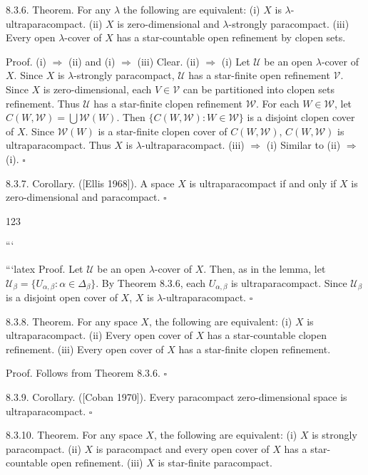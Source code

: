 \documentclass[jiang8iv.tex]{subfiles}
\begin{document}
8.3.6. Theorem. For any \(\lambda\) the following are equivalent:
(i) \(X\) is \(\lambda\)-ultraparacompact.
(ii) \(X\) is zero-dimensional and \(\lambda\)-strongly paracompact.
(iii) Every open \(\lambda\)-cover of \(X\) has a star-countable open refinement by clopen sets.

Proof. (i) \(\Rightarrow\) (ii) and (i) \(\Rightarrow\) (iii) Clear.
(ii) \(\Rightarrow\) (i) Let \(\mathscr{U}\) be an open \(\lambda\)-cover of \(X\). Since \(X\) is \(\lambda\)-strongly paracompact, \(\mathscr{U}\) has a star-finite open refinement \(\mathscr{V}\). Since \(X\) is zero-dimensional, each \(V\in\mathscr{V}\) can be partitioned into clopen sets refinement. Thus \(\mathscr{U}\) has a star-finite clopen refinement \(\mathscr{W}\). For each \(W\in\mathscr{W}\), let \(C(W,\mathscr{W})=\bigcup\mathscr{W}(W)\). Then \(\{C(W,\mathscr{W}): W\in\mathscr{W}\}\) is a disjoint clopen cover of \(X\). Since \(\mathscr{W}(W)\) is a star-finite clopen cover of \(C(W,\mathscr{W})\), \(C(W,\mathscr{W})\) is ultraparacompact. Thus \(X\) is \(\lambda\)-ultraparacompact.
(iii) \(\Rightarrow\) (i) Similar to (ii) \(\Rightarrow\) (i). \(\square\)

8.3.7. Corollary. ([Ellis 1968]). A space \(X\) is ultraparacompact if and only if \(X\) is zero-dimensional and paracompact. \(\square\)

123

```

```latex
Proof. Let \(\mathscr{U}\) be an open \(\lambda\)-cover of \(X\). Then, as in the lemma, let \(\mathscr{U}_\beta=\{U_{\alpha,\beta}: \alpha\in\Delta_\beta\}\).
By Theorem 8.3.6, each \(U_{\alpha,\beta}\) is ultraparacompact. Since \(\mathscr{U}_\beta\) is a disjoint open cover of \(X\), \(X\) is \(\lambda\)-ultraparacompact. \(\square\)

8.3.8. Theorem. For any space \(X\), the following are equivalent:
(i) \(X\) is ultraparacompact.
(ii) Every open cover of \(X\) has a star-countable clopen refinement.
(iii) Every open cover of \(X\) has a star-finite clopen refinement.

Proof. Follows from Theorem 8.3.6. \(\square\)

8.3.9. Corollary. ([Coban 1970]). Every paracompact zero-dimensional space is ultraparacompact. \(\square\)

8.3.10. Theorem. For any space \(X\), the following are equivalent:
(i) \(X\) is strongly paracompact.
(ii) \(X\) is paracompact and every open cover of \(X\) has a star-countable open refinement.
(iii) \(X\) is star-finite paracompact.
\end{document}
